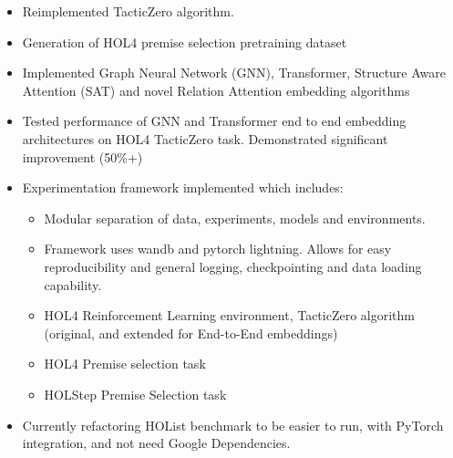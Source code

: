 \documentclass{article}
\begin{document}
    \begin{itemize}
        \item Reimplemented TacticZero algorithm.
        \item Generation of HOL4 premise selection pretraining dataset
        \item Implemented Graph Neural Network (GNN), Transformer, Structure Aware Attention (SAT) and novel Relation Attention embedding algorithms
        \item Tested performance of GNN and Transformer end to end embedding architectures on HOL4 TacticZero task.
        Demonstrated significant improvement (50\%+)
        \item Experimentation framework implemented which includes:
        \begin{itemize}
            \item Modular separation of data, experiments, models and environments.
            \item Framework uses wandb and pytorch lightning.
            Allows for easy reproducibility and general logging, checkpointing and data loading capability.
            \item HOL4 Reinforcement Learning environment, TacticZero algorithm (original, and extended for End-to-End embeddings)
            \item HOL4 Premise selection task
            \item HOLStep Premise Selection task
        \end{itemize}
        \item Currently refactoring HOList benchmark to be easier to run, with PyTorch integration, and not need Google Dependencies.
    \end{itemize}

    \printbibliography
\end{document}

